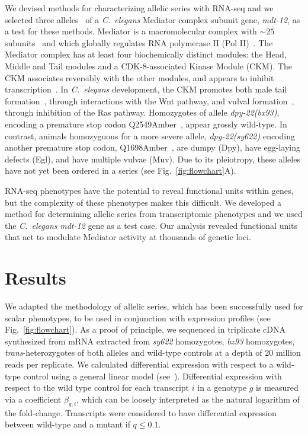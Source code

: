 \documentclass[8pt, twocolumn]{article}
\newcommand{\cel}{\emph{C.~elegans}}
\newcommand{\gene}[1]{\mbox{\emph{#1}}}
\newcommand{\protein}[1]{\mbox{\uppercase{#1}}}
\newcommand{\dpy}{\gene{mdt-12}}
\begin{document}
We devised methods for characterizing allelic series with RNA-seq and we
selected three alleles~\cite{Zhang2000,Moghal2003} of a \cel{} Mediator complex
subunit gene, \dpy{}, as a test for these methods. Mediator is a macromolecular
complex with $\sim25$ subunits~\cite{Jeronimo2017} and which globally regulates
RNA polymerase II (Pol II)~\cite{Allen2015,Takagi2006}. The Mediator complex
has at least four biochemically distinct modules: the Head, Middle and Tail
modules and a CDK-8-associated Kinase Module (CKM). The CKM associates reversibly
with the other modules, and appears to inhibit
transcription~\cite{Knuesel2009,Elmlund2006}.
In \cel{} development, the CKM promotes both male tail
formation~\cite{Zhang2000}, through interactions with the Wnt pathway, and
vulval formation~\cite{Moghal2003a}, through inhibition of the Ras pathway.
Homozygotes of allele \gene{dpy-22(bx93)}, encoding a premature stop codon
Q2549Amber~\cite{Zhang2000}, appear grossly wild-type. In contrast, animals
homozyguous for a more severe allele, \gene{dpy-22(sy622)} encoding another
premature stop codon, Q1698Amber~\cite{Moghal2003}, are dumpy (Dpy), have
egg-laying defects (Egl), and have multiple vulvae (Muv). Due to its pleiotropy,
these alleles have not yet been ordered in a series (see
Fig.~\ref{fig:flowchart}A).

RNA-seq phenotypes have the potential to reveal functional units within genes,
but the complexity of these phenotypes makes this difficult. We developed a
method for determining allelic series from transcriptomic phenotypes and we used
the \cel{} \dpy{} gene as a test case. Our analysis revealed functional units
that act to modulate Mediator activity at thousands of genetic loci.


\section*{Results}
We adapted the methodology of allelic series, which has been successfully used
for scalar phenotypes, to be used in conjunction with expression profiles (see
Fig.~\ref{fig:flowchart}).
As a proof of principle, we sequenced in triplicate cDNA synthesized from mRNA
extracted from \emph{sy622} homozygotes, \emph{bx93} homozygotes,
\emph{trans}-heterozygotes of both alleles and wild-type controls at a depth of
20 million reads per replicate. We calculated differential expression with
respect to a wild-type control using a general linear model
(see~). Differential expression with respect to the
wild type control for each transcript $i$ in a genotype $g$ is measured via a
coefficient $\beta_{g, i}$, which can be loosely interpreted as the natural
logarithm of the fold-change. Transcripts were considered to have differential
expression between wild-type and a mutant if $q\leq 0.1$.
\end{document}
